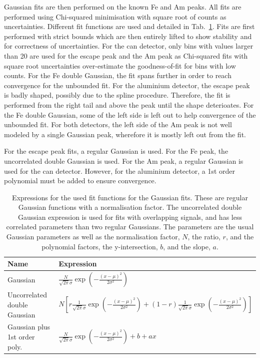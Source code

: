 Gaussian fits are then performed on the known Fe and Am peaks. All fits are performed using Chi-squared minimisation with square root of counts as uncertainties. Different fit functions are used and detailed in Tab.~\ref{tab:fitfuncchannelfits}. Fits are first performed with strict bounds which are then entirely lifted to show stability and for correctness of uncertainties. For the can detector, only bins with values larger than 20 are used for the escape peak and the Am peak as Chi-squared fits with square root uncertainties over-estimate the goodness-of-fit for bins with low counts. For the Fe double Gaussian, the fit spans further in order to reach convergence for the unbounded fit. For the aluminium detector, the escape peak is badly shaped, possibly due to the spline procedure. Therefore, the fit is performed from the right tail and above the peak until the shape deterioates. For the Fe double Gaussian, some of the left side is left out to help convergence of the unbounded fit. For both detectors, the left side of the Am peak is not well modeled by a single Gaussian peak, wherefore it is mostly left out from the fit.

For the escape peak fits, a regular Gaussian is used. For the Fe peak, the uncorrelated double Gaussian is used. For the Am peak, a regular Gaussian is used for the can detector. However, for the aluminium detector, a 1st order polynomial must be added to ensure convergence.

\begin{table}[htb]
  \centering
\begin{tabular}{ll}
\textbf{Name}                 & \textbf{Expression} \\ \hline
Gaussian                      & $\frac{N}{\sqrt{2\pi}\sigma}\exp{\left(-\frac{\left(x-\mu\right)^2}{2\sigma^2}\right)}$                    \\
Uncorrelated double Gaussian  & $N\left[r\frac{1}{\sqrt{2\pi}\sigma}\exp{\left(-\frac{\left(x-\mu\right)^2}{2\sigma^2}\right)}+(1-r)\frac{1}{\sqrt{2\pi}\sigma}\exp{\left(-\frac{\left(x-\mu\right)^2}{2\sigma^2}\right)}\right]$                     \\
Gaussian plus 1st order poly. & $\frac{N}{\sqrt{2\pi}\sigma}\exp{\left(-\frac{\left(x-\mu\right)^2}{2\sigma^2}\right)} + b + ax$                   
\end{tabular}
\caption{Expressions for the used fit functions for the Gaussian fits. These are regular Gaussian functions with a normalisation factor. The uncorrelated double Gaussian expression is used for fits with overlapping signals, and has less correlated parameters than two regular Gaussians. The parameters are the usual Gaussian parameters as well as the normalisation factor, $N$, the ratio, $r$, and the polynomial factors, the y-intersection, $b$, and the slope, $a$.}
\label{tab:fitfuncchannelfits}
\end{table}

